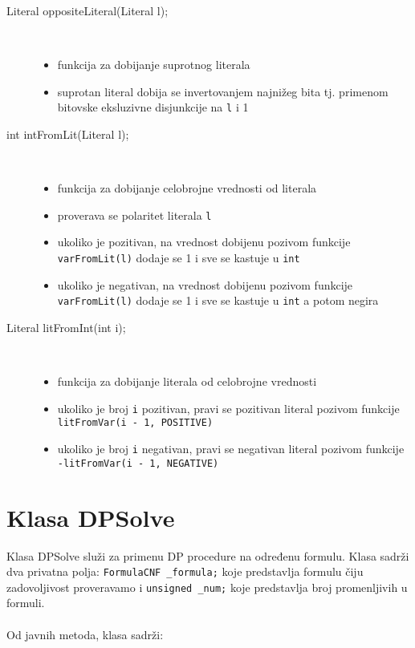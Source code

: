 \documentclass[a4paper, 12pt]{article}
\begin{document}
\begin{description}
	\item[Literal oppositeLiteral(Literal l);] ~ 
	\begin{itemize}
		\item funkcija za dobijanje suprotnog literala
		\item suprotan literal dobija se invertovanjem najnižeg bita tj. primenom bitovske eksluzivne disjunkcije na \verb|l| i 1
	\end{itemize} 
	
	\item[int intFromLit(Literal l);] ~ 
	\begin{itemize}
		\item funkcija za dobijanje celobrojne vrednosti od literala
		\item proverava se polaritet literala \verb|l| 
		\item ukoliko je pozitivan, na vrednost dobijenu pozivom funkcije \verb|varFromLit(l)| dodaje se 1 i sve se kastuje u \verb|int|
		\item ukoliko je negativan, na vrednost dobijenu pozivom funkcije \verb|varFromLit(l)| dodaje se 1 i sve se kastuje u \verb|int| a potom negira
	\end{itemize}

	\item[Literal litFromInt(int i);] ~ 
	\begin{itemize}
		\item funkcija za dobijanje literala od celobrojne vrednosti
		\item ukoliko je broj \verb|i| pozitivan, pravi se pozitivan literal pozivom funkcije \verb|litFromVar(i - 1, POSITIVE)|
		\item ukoliko je broj \verb|i| negativan, pravi se negativan literal pozivom funkcije \verb|-litFromVar(i - 1, NEGATIVE)|
	\end{itemize}
\end{description}






\section{Klasa DPSolve}

Klasa DPSolve služi za primenu DP procedure na određenu formulu. Klasa sadrži dva privatna polja:   \verb|FormulaCNF _formula;| koje predstavlja formulu čiju zadovoljivost proveravamo i \verb|unsigned _num;| koje predstavlja broj promenljivih u formuli.
\\
\\
\noindent Od javnih metoda, klasa sadrži:
\end{document}
